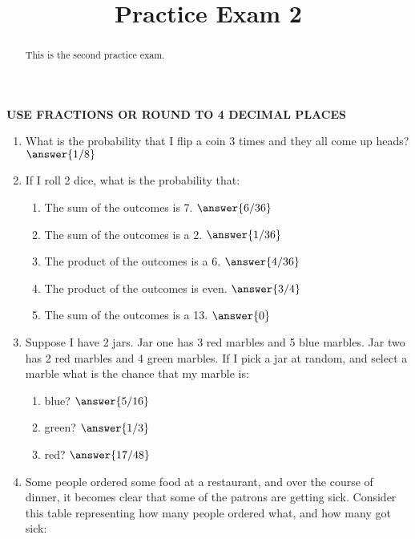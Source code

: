 \documentclass{ximera}
\title{Practice Exam 2}
\begin{document}
      
\begin{abstract}
      
This is the second practice exam.
      
\end{abstract}
      
\maketitle
      
 \textbf{USE FRACTIONS OR ROUND TO 4 DECIMAL PLACES}
 
 \begin{enumerate}
\item What is the probability that I flip a coin 3 times and they all come up heads? $\answer{1/8}$
\item If I roll 2 dice, what is the probability that:
\begin{enumerate}
\item The sum of the outcomes is 7. $\answer{6/36}$
\item The sum of the outcomes is a 2. $\answer{1/36}$
\item The product of the outcomes is a 6. $\answer{4/36}$
\item The product of the outcomes is even. $\answer{3/4}$
\item The sum of the outcomes is a 13. $\answer{0}$
\end{enumerate}
\item Suppose I have 2 jars.  Jar one has 3 red marbles and 5 blue marbles.  Jar two has 2 red marbles and 4 green marbles.  If I pick a jar at random, and select a marble what is the chance that my marble is:
\begin{enumerate}
\item blue? $\answer{5/16}$
\item green? $\answer{1/3}$
\item red? $\answer{17/48}$
\end{enumerate}
\item Some people ordered some food at a restaurant, and over the course of  dinner, it becomes clear that some of the patrons are getting sick.  Consider this table representing how many people ordered what, and how many got sick:


\end{enumerate}
\end{document}
